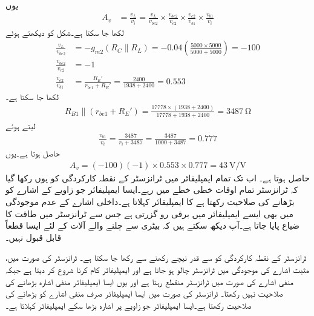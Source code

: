یوں
\begin{align*}
A_v&=\frac{v_L}{v_i}=\frac{v_L}{v_{be2}} \times   \frac{v_{be2}}{v_{e2}} \times   \frac{v_{e2}}{v_{b1}} \times \frac{v_{b1}}{v_i}
\end{align*}
لکھا جا سکتا ہے۔شکل کو دیکھتے ہوئے
\begin{align*}
\frac{v_L}{v_{be2}}&=-g_{m2} \left(R_C \mathbin{\|} R_L \right)=-0.04 \left(\frac{5000 \times 5000}{5000+5000} \right)=-100\\
\frac{v_{be2}}{v_{e2}}&=-1\\
\frac{v_{e2}}{v_{b1}}&=\frac{R_E'}{r_{be1}+R_E'}=\frac{2400}{1938+2400}=0.553
\end{align*}
لکھا جا سکتا ہے۔
\begin{align*}
R_{B1} \mathbin{\|} \left(r_{be1}+R_E' \right)=\frac{17778 \times \left(1938+2400 \right)}{17778+1938+2400}=\SI{3487}{\ohm}
\end{align*}
لیتے ہوئے
\begin{align*}
\frac{v_{b1}}{v_i}=\frac{3487}{r_i+3487}=\frac{3487}{1000+3487}=0.777
\end{align*}
حاصل ہوتا ہے۔یوں
\begin{align*}
A_v=(-100)(-1) \times 0.553 \times 0.777=\SI{43}{\volt \per \volt}
\end{align*}
حاصل ہوتا ہے۔
اب تک تمام ایمپلیفائر میں ٹرانزسٹر کے نقطہ کارکردگی کو یوں  رکھا گیا کہ ٹرانزسٹر تمام اوقات خطی خطے میں رہے۔ایسا ایمپلیفائر جو  زاویے کے اشارے کو بڑھانے کی صلاحیت رکھتا ہے   کا ایمپلیفائر کہلاتا  ہے۔داخلی اشارے کے عدم موجودگی میں بھی ایسے ایمپلیفائر میں  برقی رو گزرتی ہے جس سے ٹرانزسٹر میں  طاقت کا ضیاع پایا جاتا ہے۔آپ دیکھ سکتے ہیں کہ بیٹری سے چلنے والے آلات کے لئے ایسا قطعاً  قابل قبول نہیں۔

ٹرانزسٹر کے نقطہ کارکردگی کو   سے قدر نیچے رکھنے سے   رکھا جا سکتا ہے۔ ٹرانزسٹر کی صورت میں، مثبت اشارے کی موجودگی میں  ٹرانزسٹر چالو ہو جاتا ہے اور ایمپلیفائر کام کرنا شروع کر دیتا ہے جبکہ منفی اشارے کی صورت میں ٹرانزسٹر منقطع  رہتا ہے اور یوں ایسا ایمپلیفائر منفی اشارہ  بڑھانے کی صلاحیت نہیں رکھتا۔ ٹرانزسٹر کی صورت  میں ایسا ایمپلیفائر صرف منفی اشارے کو بڑھانے کی صلاحیت رکھتا ہے۔ایسا ایمپلیفائر جو  زاویے پر اشارہ بڑھا سکے  ایمپلیفائر کہلاتا ہے۔


